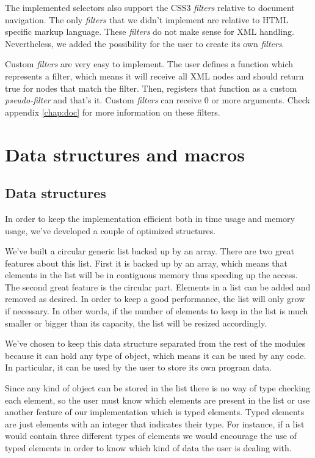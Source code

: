 \documentclass[a4paper]{report}
\begin{document}
		The implemented selectors also support  the CSS3 \emph{filters} relative to document navigation. The only \emph{filters} that  we didn't implement are relative to HTML specific markup language. 
		These \emph{filters} do not make sense for XML handling. Nevertheless, we added the possibility for the user to create its own \emph{filters}.
		
		Custom \emph{filters} are very easy to implement. The user defines a function which represents a filter, which means it will receive all XML nodes and should return true for nodes that match the filter.
		Then, registers that function as a custom \emph{pseudo-filter} and that's it. Custom \emph{filters} can receive 0 or more arguments. Check appendix \ref{chap:doc} for more information on these filters.
			
\section{Data structures and macros}\label{sec:helpers}

	\subsection{Data structures}
		In order to keep the implementation efficient both in time usage and memory usage, we've developed a couple of optimized structures. 
		
		We've built a circular generic list backed up by an array. There are two great features about this list. First it is backed up by an array, which means that elements in the list will be in contiguous memory thus speeding
		up the access. The second great feature is the circular part. Elements in a list can be added and removed as desired. In order to keep a good performance, the list will only grow if necessary. In other words, if the 
		number of elements to keep in the list is much smaller or bigger than its capacity, the list will be resized accordingly.
		
		We've chosen to keep this data structure separated from the rest of the modules because it can hold any type of object, which means it can be used by any code. In particular, it can be used by the user to store its
		own program data.
		
		Since any kind of object can be stored in the list there is no way of type checking each element, so the user must know which elements are present in the list or use another feature of our implementation which is typed 
		elements. Typed elements are just elements with an integer that indicates their type. For instance, if a list would contain three different types of elements we would encourage the use of typed elements in order 
		to know which kind of data the user is dealing with.
		
\end{document}
